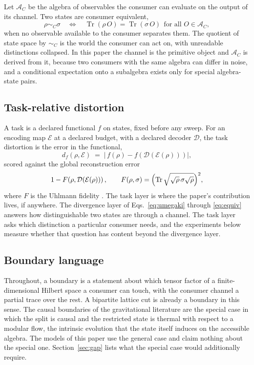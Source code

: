 \documentclass[aps,prd,reprint,nofootinbib,longbibliography]{revtex4-2}
\newcommand{\Tr}{\operatorname{Tr}}
\newcommand{\Ac}{\mathcal{A}}
\newcommand{\Dc}{\mathcal{D}}
\newcommand{\Ec}{\mathcal{E}}
\begin{document}
Let $\Ac_C$ be the algebra of observables the consumer can evaluate on the
output of its channel.  Two states are consumer equivalent,
\begin{equation}
\rho \sim_C \sigma
\quad\Longleftrightarrow\quad
\Tr(\rho\,O)=\Tr(\sigma\,O)\ \ \text{for all } O\in\Ac_C ,
\label{eq:equiv}
\end{equation}
when no observable available to the consumer separates them.  The quotient
of state space by $\sim_C$ is the world the consumer can act on, with
unreadable distinctions collapsed.  In this paper the channel is the
primitive object and $\Ac_C$ is derived from it, because two consumers with
the same algebra can differ in noise, and a conditional expectation onto a
subalgebra exists only for special algebra-state pairs.

\subsection{Task-relative distortion}

A task is a declared functional $f$ on states, fixed before any sweep.  For
an encoding map $\Ec$ at a declared budget, with a declared decoder $\Dc$,
the task distortion is the error in the functional,
\begin{equation}
d_f(\rho,\Ec) \;=\; \bigl|\,f(\rho)-f\!\left(\Dc(\Ec(\rho))\right)\bigr| ,
\label{eq:taskdist}
\end{equation}
scored against the global reconstruction error
\begin{equation}
1-F\!\left(\rho,\Dc(\Ec(\rho))\right),
\qquad
F(\rho,\sigma)=\Bigl(\Tr\sqrt{\sqrt{\rho}\,\sigma\sqrt{\rho}}\Bigr)^{2},
\label{eq:infid}
\end{equation}
where $F$ is the Uhlmann fidelity \cite{Uhlmann1976,Jozsa1994}.  The task
layer is where the paper's contribution lives, if anywhere.  The divergence
layer of Eqs.~\eqref{eq:umegaki} through \eqref{eq:equiv} answers how
distinguishable two states are through a channel.  The task layer asks which
distinction a particular consumer needs, and the experiments below measure
whether that question has content beyond the divergence layer.

\subsection{Boundary language}

Throughout, a boundary is a statement about which tensor factor of a
finite-dimensional Hilbert space a consumer can touch, with the consumer
channel a partial trace over the rest.  A bipartite lattice cut is already a
boundary in this sense.  The causal boundaries of the gravitational
literature are the special case in which the split is causal and the
restricted state is thermal with respect to a modular flow, the intrinsic
evolution that the state itself induces on the accessible algebra.  The models of
this paper use the general case and claim nothing about the special one.
Section~\ref{sec:gap} lists what the special case would additionally
require.
\end{document}
